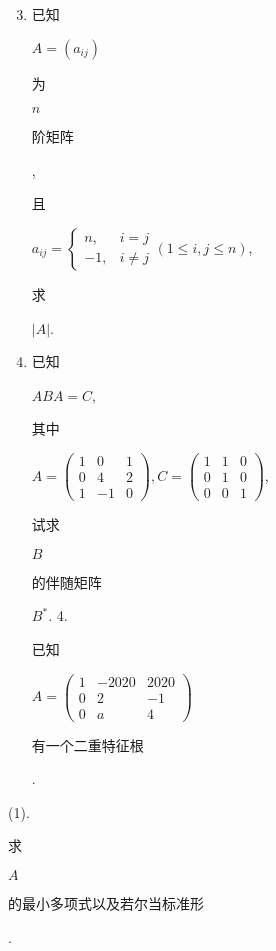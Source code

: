 \documentclass[10pt]{article}
\begin{document}
\begin{enumerate}
  \setcounter{enumi}{2}
  \item \begin{CJK}{UTF8}{mj}已知\end{CJK} $A=\left(a_{i j}\right)$ \begin{CJK}{UTF8}{mj}为\end{CJK} $n$ \begin{CJK}{UTF8}{mj}阶矩阵\end{CJK}, \begin{CJK}{UTF8}{mj}且\end{CJK} $a_{i j}=\left\{\begin{array}{ll}n, & i=j \\ -1, & i \neq j\end{array}(1 \leq i, j \leq n)\right.$, \begin{CJK}{UTF8}{mj}求\end{CJK} $|A|$.

  \item \begin{CJK}{UTF8}{mj}已知\end{CJK} $A B A=C$, \begin{CJK}{UTF8}{mj}其中\end{CJK} $A=\left(\begin{array}{ccc}1 & 0 & 1 \\ 0 & 4 & 2 \\ 1 & -1 & 0\end{array}\right), C=\left(\begin{array}{ccc}1 & 1 & 0 \\ 0 & 1 & 0 \\ 0 & 0 & 1\end{array}\right)$, \begin{CJK}{UTF8}{mj}试求\end{CJK} $B$ \begin{CJK}{UTF8}{mj}的伴随矩阵\end{CJK} $B^{*}$. 4. \begin{CJK}{UTF8}{mj}已知\end{CJK} $A=\left(\begin{array}{ccc}1 & -2020 & 2020 \\ 0 & 2 & -1 \\ 0 & a & 4\end{array}\right)$ \begin{CJK}{UTF8}{mj}有一个二重特征根\end{CJK}.

\end{enumerate}
(1). \begin{CJK}{UTF8}{mj}求\end{CJK} $A$ \begin{CJK}{UTF8}{mj}的最小多项式以及若尔当标准形\end{CJK}.
\end{document}
